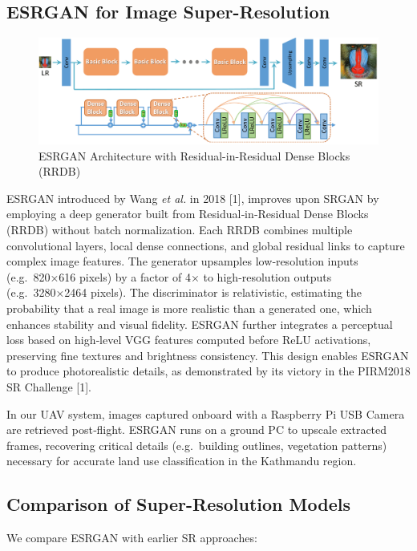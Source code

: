 \subsection{ESRGAN for Image Super-Resolution}
\begin{figure}[H]
    \centering
    \includegraphics[width=0.85\linewidth]{images/esrganarchi.png}
    \caption{ESRGAN Architecture with Residual-in-Residual Dense Blocks (RRDB)}
    \label{fig:esrgan}
\end{figure}
ESRGAN introduced by Wang \emph{et al.} in 2018 [1], improves upon SRGAN by employing a deep generator built from Residual‑in‑Residual Dense Blocks (RRDB) without batch normalization. Each RRDB combines multiple convolutional layers, local dense connections, and global residual links to capture complex image features. The generator upsamples low‑resolution inputs (e.g.\ 820×616 pixels) by a factor of 4× to high‑resolution outputs (e.g.\ 3280×2464 pixels). The discriminator is relativistic, estimating the probability that a real image is more realistic than a generated one, which enhances stability and visual fidelity. ESRGAN further integrates a perceptual loss based on high‑level VGG features computed before ReLU activations, preserving fine textures and brightness consistency. This design enables ESRGAN to produce photorealistic details, as demonstrated by its victory in the PIRM2018 SR Challenge [1].

In our UAV system, images captured onboard with a Raspberry Pi USB Camera are retrieved post‑flight. ESRGAN runs on a ground PC to upscale extracted frames, recovering critical details (e.g.\ building outlines, vegetation patterns) necessary for accurate land use classification in the Kathmandu region.

\subsection{Comparison of Super-Resolution Models}
We compare ESRGAN with earlier SR approaches:

